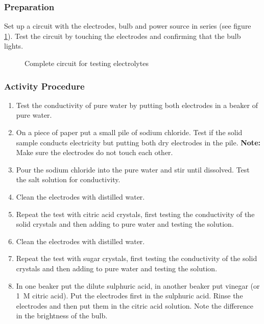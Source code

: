 \subsubsection*{Preparation}
Set up a circuit with the electrodes, bulb and power source in series (see figure \ref{electrolyte-circuit}). Test the circuit by touching the electrodes and confirming that the bulb lights.

\begin{figure}[h]
\begin{center}
\def\svgwidth{150pt}

\caption{Complete circuit for testing electrolytes}
\label{electrolyte-circuit}
\end{center}
\end{figure}

\subsubsection*{Activity Procedure}
\begin{enumerate}
\item{Test the conductivity of pure water by putting both electrodes in a beaker of pure water.}
\item{On a piece of paper put a small pile of sodium chloride. Test if the solid sample conducts electricity but putting both dry electrodes in the pile. \textbf{Note:} Make sure the electrodes do not touch each other.}
\item{Pour the sodium chloride into the pure water and stir until dissolved. Test the salt solution for conductivity.}
\item{Clean the electrodes with distilled water.}
\item{Repeat the test with citric acid crystals, first testing the conductivity of the solid crystals and then adding to pure water and testing the solution.}
\item{Clean the electrodes with distilled water.}
\item{Repeat the test with sugar crystals, first testing the conductivity of the solid crystals and then adding to pure water and testing the solution.}
\item{In one beaker put the dilute sulphuric acid, in another beaker put vinegar (or 1~M citric acid). Put the electrodes first in the sulphuric acid. Rinse the electrodes and then put them in the citric acid solution. Note the difference in the brightness of the bulb.}
\end{enumerate}

